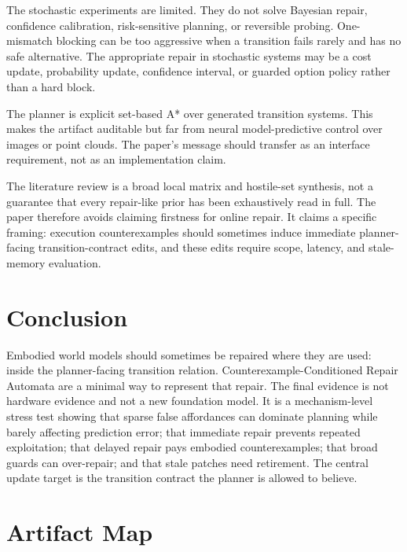 \documentclass{article}
\begin{document}
The stochastic experiments are limited. They do not solve Bayesian repair, confidence calibration, risk-sensitive planning, or reversible probing. One-mismatch blocking can be too aggressive when a transition fails rarely and has no safe alternative. The appropriate repair in stochastic systems may be a cost update, probability update, confidence interval, or guarded option policy rather than a hard block.

The planner is explicit set-based A* over generated transition systems. This makes the artifact auditable but far from neural model-predictive control over images or point clouds. The paper's message should transfer as an interface requirement, not as an implementation claim.

The literature review is a broad local matrix and hostile-set synthesis, not a guarantee that every repair-like prior has been exhaustively read in full. The paper therefore avoids claiming firstness for online repair. It claims a specific framing: execution counterexamples should sometimes induce immediate planner-facing transition-contract edits, and these edits require scope, latency, and stale-memory evaluation.

\section{Conclusion}

Embodied world models should sometimes be repaired where they are used: inside the planner-facing transition relation. Counterexample-Conditioned Repair Automata are a minimal way to represent that repair. The final evidence is not hardware evidence and not a new foundation model. It is a mechanism-level stress test showing that sparse false affordances can dominate planning while barely affecting prediction error; that immediate repair prevents repeated exploitation; that delayed repair pays embodied counterexamples; that broad guards can over-repair; and that stale patches need retirement. The central update target is the transition contract the planner is allowed to believe.




\appendix
\setcounter{section}{0}
\renewcommand{\thesection}{A.\arabic{section}}

\section{Artifact Map}
\end{document}
